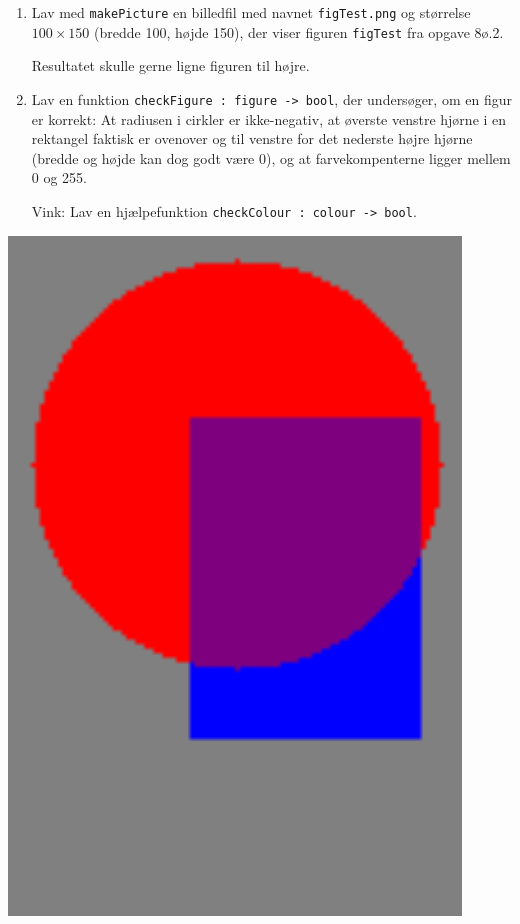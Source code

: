 \documentclass[a4paper,12pt]{article}
\begin{document}
\begin{minipage}{.72\textwidth}
\begin{enumerate}[label=8ø.\arabic*,start=4]
\item Lav med \texttt{makePicture} en billedfil med navnet
  \texttt{figTest.png} og størrelse $100\times150$ (bredde 100, højde 150),
  der viser figuren \texttt{figTest} fra opgave 8ø.2.

  Resultatet skulle gerne ligne figuren til højre.

\item Lav en funktion \texttt{checkFigure : figure -> bool},
  der undersøger, om en figur er korrekt: At radiusen i cirkler
  er ikke-negativ, at øverste venstre hjørne i en rektangel faktisk
  er ovenover og til venstre for det nederste højre hjørne (bredde og
  højde kan dog godt være 0), og at farvekompenterne ligger mellem 0
  og 255.

  Vink: Lav en hjælpefunktion \texttt{checkColour : colour -> bool}.
\end{enumerate}

\end{minipage} \hfill \begin{minipage}{.2\textwidth}
  \includegraphics[width=0.9\textwidth]{figTest.png}
\end{minipage}
\end{document}
